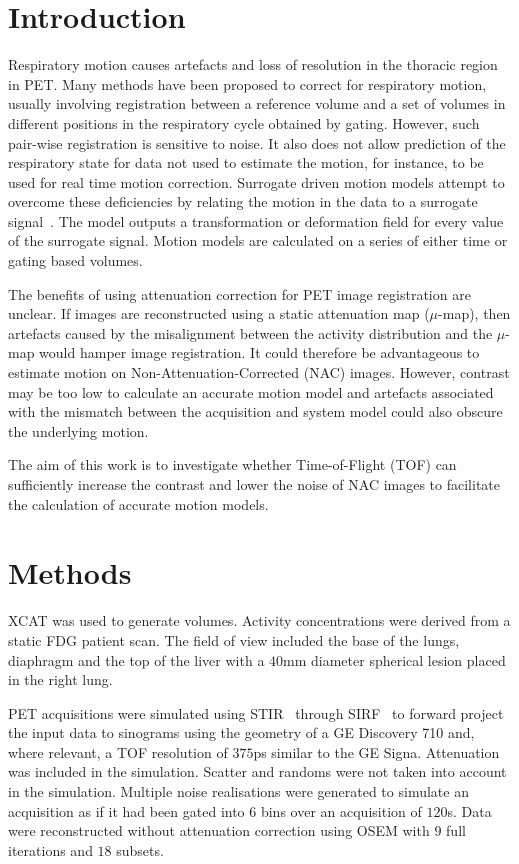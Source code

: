 \documentclass[portrait,color=UCLburgundy,margin=2cm]{uclposter}
\begin{document}
\begin{multicols}{4}
\large

\section*{Introduction}
Respiratory motion causes artefacts and loss of resolution in the thoracic region in PET. Many methods have been proposed to correct for respiratory motion, usually involving registration between a reference volume and a set of volumes in different positions in the respiratory cycle obtained by gating. However, such pair-wise registration is sensitive to noise. It also does not allow prediction of the respiratory state for data not used to estimate the motion, for instance, to be used for real time motion correction. Surrogate driven motion models attempt to overcome these deficiencies by relating the motion in the data to a surrogate signal~\cite{McClelland2013}. The model outputs a transformation or deformation field for every value of the surrogate signal. Motion models are calculated on a series of either time or gating based volumes.

The benefits of using attenuation correction for PET image registration are unclear. If images are reconstructed using a static attenuation map ($\mu$-map), then artefacts caused by the misalignment between the activity distribution and the $\mu$-map would hamper image registration. It could therefore be advantageous to estimate motion on Non-Attenuation-Corrected (NAC) images. However, contrast may be too low to calculate an accurate motion model and artefacts associated with the mismatch between the acquisition and system model could also obscure the underlying motion. 

The aim of this work is to investigate whether Time-of-Flight (TOF) can sufficiently increase the contrast and lower the noise of NAC images to facilitate the calculation of accurate motion models.

\section*{Methods}
XCAT was used to generate volumes. Activity concentrations were derived from a static FDG patient scan. The field of view included the base of the lungs, diaphragm and the top of the liver with a $40$mm diameter spherical lesion placed in the right lung.

PET acquisitions were simulated using STIR~\cite{Thielemans2012,Efthimiou2018} through SIRF~\cite{Ovtchinnikov2017} to forward project the input data to sinograms using the geometry of a GE Discovery 710 and, where relevant, a TOF resolution of $375$ps similar to the GE Signa. Attenuation was included in the simulation. Scatter and randoms were not taken into account in the simulation. Multiple noise realisations were generated to simulate an acquisition as if it had been gated into $6$ bins over an acquisition of $120$s. Data were reconstructed without attenuation correction using OSEM with $9$ full iterations and $18$ subsets. 


\end{multicols}
\end{document}
